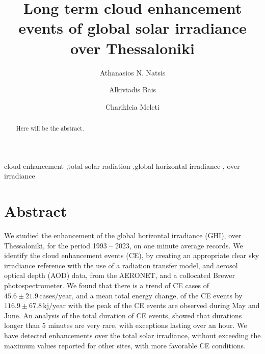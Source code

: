 \documentclass[preprint, 5p,
authoryear]{elsarticle} %
\begin{document}
\begin{frontmatter}

  \title{Long term cloud enhancement events of global solar irradiance
over Thessaloniki}
    \author[LAP]{Athanasios N. Natsis%
  }
    \author[LAP]{Alkiviadis Bais%
  }
    \author[LAP]{Charikleia Meleti%
  }
  
  \begin{abstract}
  Here will be the abstract.
  \end{abstract}
    \begin{keyword}
    cloud enhancement \sep total solar radiation \sep global horizontal
irradiance \sep 
    over irradiance
  \end{keyword}
  
 \end{frontmatter}

\hypertarget{abstract}{%
\section*{Abstract}\label{abstract}}

We studied the enhancement of the global horizontal irradiance (GHI),
over Thessaloniki, for the period 1993 -- 2023, on one minute average
records. We identify the cloud enhancement events (CE), by creating an
appropriate clear sky irradiance reference with the use of a radiation
transfer model, and aerosol optical depth (AOD) data, from the AERONET,
and a collocated Brewer photospectrometer. We found that there is a
trend of CE cases of \(45.6\pm 21.9\,\text{cases}/\text{year}\), and a
mean total energy change, of the CE events by
\(116.9\pm 67.8\,\text{kj}/\text{year}\) with the peak of the CE events
are observed during May and June. An analysis of the total duration of
CE events, showed that durations longer than 5 minutes are very rare,
with exceptions lasting over an hour. We have detected enhancements over
the total solar irradiance, without exceeding the maximum values
reported for other sites, with more favorable CE conditions.

~ ~
\end{document}
